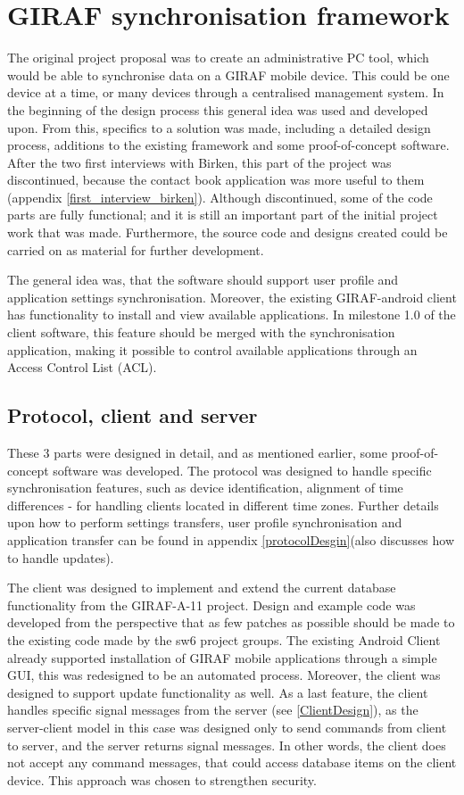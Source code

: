 \section{GIRAF synchronisation framework}
The original project proposal was to create an administrative PC tool, which would be able to synchronise data on a GIRAF mobile device. This could be one device at a time, or many devices through a centralised management system. In the beginning of the design process this general idea was used and developed upon. From this, specifics to a solution was made, including a detailed design process, additions to the existing framework and some proof-of-concept software. After the two first interviews with Birken, this part of the project was discontinued, because the contact book application was more useful to them (appendix \vref{first_interview_birken}). Although discontinued, some of the code parts are fully functional; and it is still an important part of the initial project work that was made. Furthermore, the source code and designs created could be carried on as material for further development. 

The general idea was, that the software should support user profile and application settings synchronisation. Moreover, the existing GIRAF-android client has functionality to install and view available applications. In milestone 1.0 of the client software, this feature should be merged with the synchronisation application, making it possible to control available applications through an Access Control List (ACL).

\subsection{Protocol, client and server}
These 3 parts were designed in detail, and as mentioned earlier, some proof-of-concept software was developed. The protocol was designed to handle specific synchronisation features, such as device identification, alignment of time differences - for handling clients located in different time zones. Further details upon how to perform settings transfers, user profile synchronisation and application transfer can be found in appendix \vref{protocolDesgin}(also discusses how to handle updates).  

The client was designed to implement and extend the current database functionality from the GIRAF-A-11 project. Design and example code was developed from the perspective that as few patches as possible should be made to the existing code made by the sw6 project groups.
The existing Android Client already supported installation of GIRAF mobile applications through a simple GUI, this  was redesigned to be an automated process. Moreover, the client was designed to support update functionality as well. As a last feature, the client handles specific signal messages from the server (see \vref{ClientDesign}), as the server-client model in this case was designed only to send commands from client to server, and the server returns signal messages. In other words, the client does not accept any command messages, that could access database items on the client device. This approach was chosen to strengthen security.  

